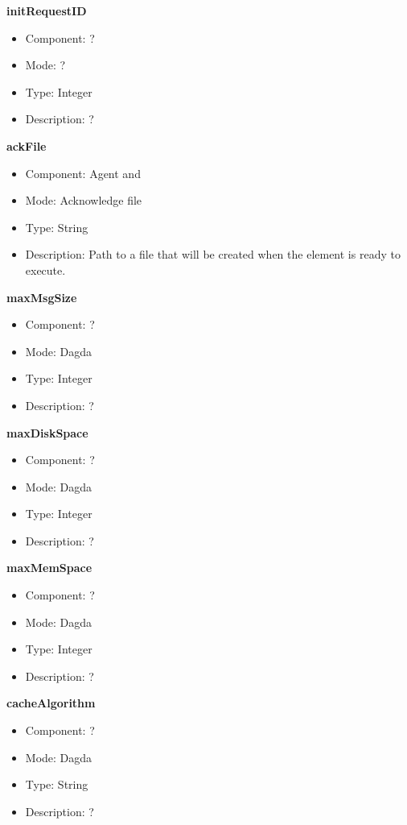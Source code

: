 \begin{description}
\item{\bf{initRequestID}}
  \begin{itemize}
  \item Component: ?
  \item Mode: ?
  \item Type: Integer
  \item Description: ?
  \end{itemize}

\item{\bf{ackFile}}
  \begin{itemize}
  \item Component: Agent and \sed
  \item Mode: Acknowledge file
  \item Type: String
  \item Description: Path to a file that will be created when the
    element is ready to execute.
  \end{itemize}

\item{\bf{maxMsgSize}}
  \begin{itemize}
  \item Component: ?
  \item Mode: Dagda
  \item Type: Integer
  \item Description: ? 
  \end{itemize}

\item{\bf{maxDiskSpace}}
  \begin{itemize}
  \item Component: ?
  \item Mode: Dagda
  \item Type: Integer
  \item Description: ?
  \end{itemize}

\item{\bf{maxMemSpace}}
  \begin{itemize}
  \item Component: ?
  \item Mode: Dagda
  \item Type: Integer
  \item Description: ?
  \end{itemize}

\item{\bf{cacheAlgorithm}}
  \begin{itemize}
  \item Component: ?
  \item Mode: Dagda
  \item Type: String
  \item Description: ? 
  \end{itemize}


\end{description}
